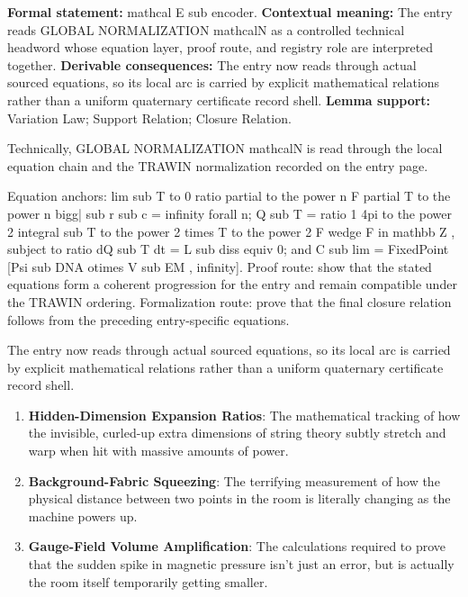 \begingroup\footnotesize\setlength{\emergencystretch}{3em}\sloppy
\textbf{Formal statement:} mathcal E sub encoder. \textbf{Contextual meaning:} The entry reads GLOBAL NORMALIZATION mathcalN as a controlled technical headword whose equation layer, proof route, and registry role are interpreted together. \textbf{Derivable consequences:} The entry now reads through actual sourced equations, so its local arc is carried by explicit mathematical relations rather than a uniform quaternary certificate record shell. \textbf{Lemma support:} Variation Law; Support Relation; Closure Relation.\par
\endgroup

Technically, GLOBAL NORMALIZATION mathcalN is read through the local equation chain and the TRAWIN normalization recorded on the entry page.

Equation anchors: lim sub T to 0 ratio partial to the power n F partial T to the power n bigg| sub r sub c = infinity forall n; Q sub T = ratio 1 4pi to the power 2 integral sub T to the power 2 times T to the power 2 F wedge F in mathbb Z , subject to ratio dQ sub T dt = L sub diss equiv 0; and C sub lim = FixedPoint [Psi sub DNA otimes V sub EM , infinity]. Proof route: show that the stated equations form a coherent progression for the entry and remain compatible under the TRAWIN ordering. Formalization route: prove that the final closure relation follows from the preceding entry-specific equations.

The entry now reads through actual sourced equations, so its local arc is carried by explicit mathematical relations rather than a uniform quaternary certificate record shell.
\endgroup

\begin{enumerate}[leftmargin=1.6em,itemsep=6pt,topsep=4pt]
\item \textbf{Hidden-Dimension Expansion Ratios}: The mathematical tracking of how the invisible, curled-up extra dimensions of string theory subtly stretch and warp when hit with massive amounts of power.
\item \textbf{Background-Fabric Squeezing}: The terrifying measurement of how the physical distance between two points in the room is literally changing as the machine powers up.
\item \textbf{Gauge-Field Volume Amplification}: The calculations required to prove that the sudden spike in magnetic pressure isn't just an error, but is actually the room itself temporarily getting smaller.
\end{enumerate}

